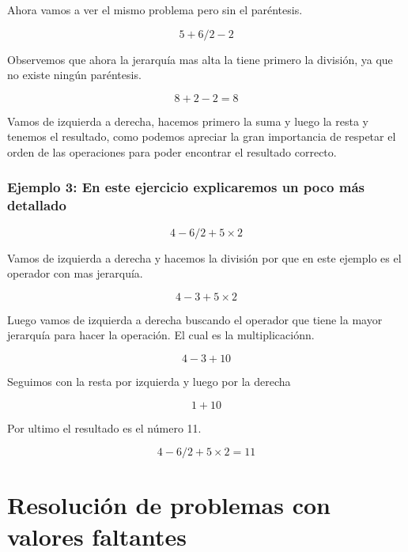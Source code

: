 \documentclass[11pt]{book}
\begin{document}
Ahora vamos a ver el mismo problema pero sin el paréntesis.

\[5 + 6 / 2 - 2\]

Observemos que ahora la jerarquía mas alta la tiene primero la división, ya que no existe ningún paréntesis.

\[8 + 2 - 2 = 8\]

Vamos de izquierda a derecha, hacemos primero la suma y luego la resta y tenemos el resultado, como podemos apreciar
la gran importancia de respetar el orden de las operaciones para poder encontrar el resultado correcto.


\subsubsection{Ejemplo 3: En este ejercicio explicaremos un poco más detallado}

\[4 - 6 / 2 + 5 \times 2\]

Vamos de izquierda a derecha y hacemos la división por que en este ejemplo es el operador con mas jerarquía.

\[4 - 3 + 5 \times 2\]

Luego vamos de izquierda a derecha buscando el operador que tiene la mayor jerarquía para hacer la operaci\'on.
El cual es la multiplicaciónn.

\[4 - 3 + 10\]

Seguimos con la resta por izquierda y luego por la derecha

\[1 + 10\]

Por ultimo el resultado es el número 11.

\[4 - 6 / 2 + 5 \times 2 = 11\]

\newpage


\begin{problemas}

\end{problemas}

\newpage \thispagestyle{plain}
\section{Resolución de problemas con valores faltantes}
\end{document}
